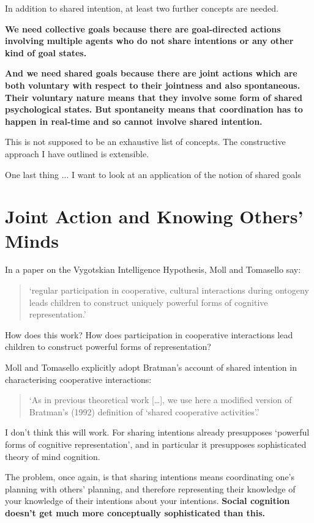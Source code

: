 \documentclass[14pt,a4paper]{extarticle}
\begin{document}
In addition to shared intention, at least two further concepts are needed.

\textbf{We need collective goals because there are goal-directed actions involving multiple agents who do not share intentions or any other kind of goal states.}

\textbf{And we need shared goals because there are joint actions which are both voluntary with respect to their jointness and also spontaneous. 
Their voluntary nature means that they involve some form of shared psychological states.
But spontaneity means that coordination has to happen in real-time and so cannot involve shared intention.}


This is not supposed to be an exhaustive list of concepts.  The constructive approach I have outlined is extensible.

One last thing ... I want to look at an application of the notion of shared goals


\section{Joint Action and Knowing Others' Minds}
In a paper on the Vygotskian Intelligence Hypothesis, Moll and Tomasello say:
%
\begin{quote}
`regular participation in cooperative, cultural interactions during ontogeny leads children to construct uniquely powerful forms of cognitive representation.'
\citep[pp.\ 2-3]{Moll:2007gu}
\end{quote}
%
How does this work?
How does participation in cooperative interactions lead children to construct powerful forms of representation?

Moll and Tomasello explicitly adopt Bratman’s account of shared intention in characterising cooperative interactions:
%
\begin{quote}
`As in previous theoretical work […], we use here a modified version of Bratman’s (1992) definition of `shared cooperative activities'.'
\citep[p.\ 3]{Moll:2007gu}
\end{quote}
%
I don't think this will work.  
For sharing intentions already presupposes `powerful forms of cognitive representation', and in particular it presupposes sophisticated theory of mind cognition. 

The problem, once again, is that sharing intentions means coordinating one's planning with others' planning, and therefore representing their knowledge of your knowledge of their intentions about your intentions.
\textbf{Social cognition doesn't get much more conceptually sophisticated than this.}
\end{document}
